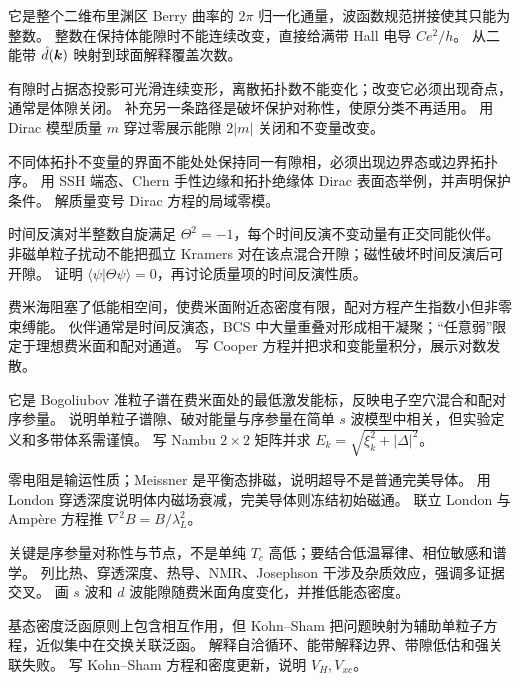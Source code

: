 {它是整个二维布里渊区 Berry 曲率的 $2\pi$ 归一化通量，波函数规范拼接使其只能为整数。}
{整数在保持体能隙时不能连续改变，直接给满带 Hall 电导 $Ce^2/h$。}
{从二能带 $\hat d(\bm{k})$ 映射到球面解释覆盖次数。}

{有隙时占据态投影可光滑连续变形，离散拓扑数不能变化；改变它必须出现奇点，通常是体隙关闭。}
{补充另一条路径是破坏保护对称性，使原分类不再适用。}
{用 Dirac 模型质量 $m$ 穿过零展示能隙 $2|m|$ 关闭和不变量改变。}

{不同体拓扑不变量的界面不能处处保持同一有隙相，必须出现边界态或边界拓扑序。}
{用 SSH 端态、Chern 手性边缘和拓扑绝缘体 Dirac 表面态举例，并声明保护条件。}
{解质量变号 Dirac 方程的局域零模。}

{时间反演对半整数自旋满足 $\Theta^2=-1$，每个时间反演不变动量有正交同能伙伴。}
{非磁单粒子扰动不能把孤立 Kramers 对在该点混合开隙；磁性破坏时间反演后可开隙。}
{证明 $\langle\psi|\Theta\psi\rangle=0$，再讨论质量项的时间反演性质。}

{费米海阻塞了低能相空间，使费米面附近态密度有限，配对方程产生指数小但非零束缚能。}
{伙伴通常是时间反演态，BCS 中大量重叠对形成相干凝聚；“任意弱”限定于理想费米面和配对通道。}
{写 Cooper 方程并把求和变能量积分，展示对数发散。}

{它是 Bogoliubov 准粒子谱在费米面处的最低激发能标，反映电子空穴混合和配对序参量。}
{说明单粒子谱隙、破对能量与序参量在简单 $s$ 波模型中相关，但实验定义和多带体系需谨慎。}
{写 Nambu $2\times2$ 矩阵并求 $E_k=\sqrt{\xi_k^2+|\Delta|^2}$。}

{零电阻是输运性质；Meissner 是平衡态排磁，说明超导不是普通完美导体。}
{用 London 穿透深度说明体内磁场衰减，完美导体则冻结初始磁通。}
{联立 London 与 Ampère 方程推 $\nabla^2B=B/\lambda_L^2$。}

{关键是序参量对称性与节点，不是单纯 $T_c$ 高低；要结合低温幂律、相位敏感和谱学。}
{列比热、穿透深度、热导、NMR、Josephson 干涉及杂质效应，强调多证据交叉。}
{画 $s$ 波和 $d$ 波能隙随费米面角度变化，并推低能态密度。}

{基态密度泛函原则上包含相互作用，但 Kohn--Sham 把问题映射为辅助单粒子方程，近似集中在交换关联泛函。}
{解释自洽循环、能带解释边界、带隙低估和强关联失败。}
{写 Kohn--Sham 方程和密度更新，说明 $V_H,V_{xc}$。}

